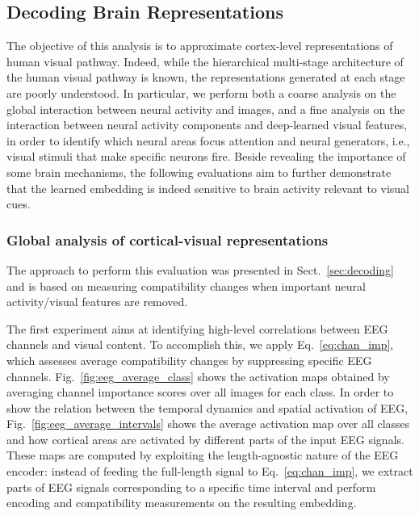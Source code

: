 \documentclass[10pt,journal,compsoc,twocolumn]{IEEEtran}
\begin{document}
\subsection{Decoding Brain Representations}\label{sec:decoding_experiments}

The objective of this analysis is to approximate cortex-level representations of human visual pathway. Indeed, while the hierarchical multi-stage architecture of the human visual pathway is known, the representations generated at each stage are  poorly understood.  In particular, we perform both a coarse analysis on the global interaction between neural activity and images, and a fine analysis on the interaction between neural activity components and deep-learned visual features, in order to identify which neural areas focus attention and neural generators, i.e., visual stimuli that make specific neurons fire.
Beside revealing the importance of some brain mechanisms, the following evaluations aim to further demonstrate that the learned embedding is indeed sensitive to brain activity relevant to visual cues.

\subsubsection{Global analysis of cortical-visual representations}
The approach to perform this evaluation was presented in Sect.~\ref{sec:decoding} and is based on measuring compatibility changes when important neural activity/visual features are removed. 

The first experiment aims at identifying high-level correlations between EEG channels and visual content. To accomplish this, we apply Eq.~\ref{eq:chan_imp}, which assesses average compatibility changes by suppressing specific EEG channels. Fig.~\ref{fig:eeg_average_class} shows the activation maps obtained by averaging channel importance scores over all images for each class. In order to show the relation between the temporal dynamics and spatial activation of EEG, Fig.~\ref{fig:eeg_average_intervals} shows the average activation map over all classes and how cortical areas are activated by different parts of the input EEG signals. These maps are computed by exploiting the length-agnostic nature of the EEG encoder: instead of feeding the full-length signal to Eq.~\ref{eq:chan_imp}, we extract parts of EEG signals corresponding to a specific time interval and perform encoding and compatibility measurements on the resulting embedding.
\end{document}

